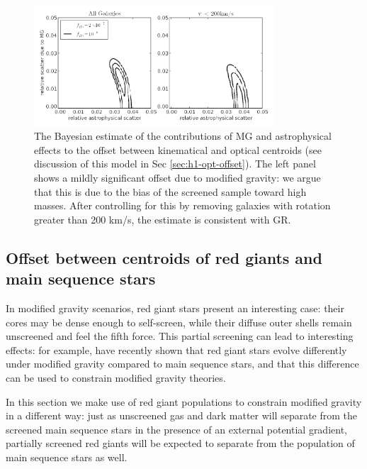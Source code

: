\documentclass[useAMS,usenatbib,twocolumn]{mn2e}
\begin{document}
\begin{figure}
\begin{center}
  \includegraphics[width=0.8\textwidth]{figures/sec4_2_offset.png}
  \caption{The Bayesian estimate of the contributions of MG and astrophysical
effects to the offset between kinematical and optical centroids
(see discussion of this model in Sec \ref{sec:h1-opt-offset}).  The left
    panel shows a mildly significant offset due to modified gravity:
    we argue that this is due to the bias of the screened sample toward
    high masses.  After controlling for this by removing galaxies
    with rotation greater than 200 km/s, the estimate is
    consistent with GR. 
    }
  \label{offset-kin-den-2}
\end{center}
\end{figure}







\subsection{Offset between centroids of red giants and main sequence stars}
\label{sec:rgb}
In modified gravity scenarios, red giant stars present an interesting case:
their cores may be dense enough to self-screen, while their diffuse outer
shells remain unscreened and feel the fifth force.  This partial screening
can lead to interesting effects: for example, 
\citet{changhui} have recently shown that red giant stars evolve differently
under modified gravity compared to main sequence stars, and that this
difference can be used to constrain modified gravity theories.

In this section we make use of red giant populations
to constrain modified gravity in a different way:
just as unscreened gas and dark matter will separate from
the screened main sequence stars in the presence
of an external potential gradient, partially screened red giants
will be expected to separate from the population
of main sequence stars as well.
\end{document}
